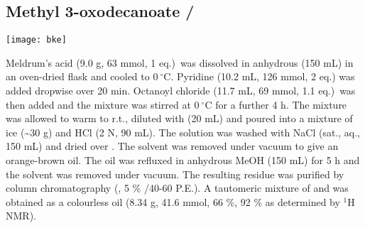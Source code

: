 \newpage

\subsection{Methyl 3-oxodecanoate /}

\begin{scheme}[H]
	\begin{center}
		\texttt{[image: bke]}
	\end{center}
\end{scheme}

Meldrum's acid (9.0 g, 63 mmol, 1 eq.)\ was dissolved in anhydrous  (150 mL) in an oven-dried flask and cooled to $0\ ^{\circ}$C. Pyridine (10.2 mL, 126 mmol, 2 eq.) was added dropwise over 20 min. Octanoyl chloride (11.7 mL, 69 mmol, 1.1 eq.)\ was then added and the mixture was stirred at $0\ ^{\circ}$C for a further 4 h. 
The mixture was allowed to warm to r.t., diluted with  (20 mL) and poured into a mixture of ice (\textasciitilde 30 g) and HCl (2 N, 90 mL). The solution was washed with NaCl (sat., aq., 150 mL) and dried over . The solvent was removed under vacuum to give an orange-brown oil.
The oil was refluxed in anhydrous MeOH (150 mL) for 5 h and the solvent was removed under vacuum. The resulting residue was purified by column chromatography (, 5 \% /40-60 P.E.). A tautomeric mixture of  and  was obtained as a colourless oil (8.34 g, 41.6 mmol, 66 \%, 92 \%  as determined by $^{1}$H NMR).
\\[1\baselineskip]

